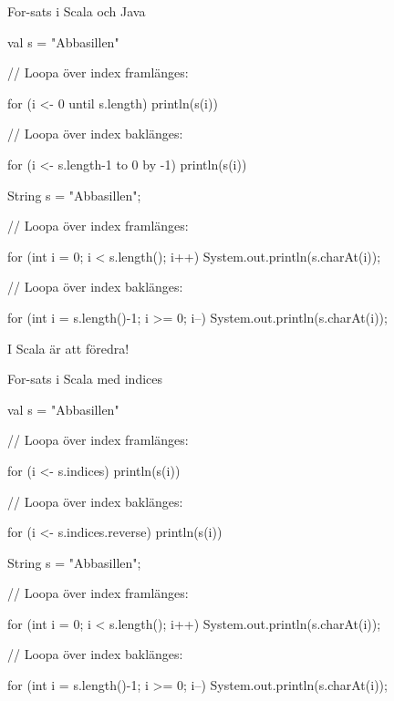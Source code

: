 \begin{Slide}{For-sats i Scala och Java}
\begin{multicols}{2}
\noindent{}
\begin{CodeSmall}[basicstyle=\ttfamily\SlideFontSize{6}{8},backgroundcolor=\color{white},
  frame=none]
val s = "Abbasillen"

// Loopa över index framlänges:

for (i <- 0 until s.length) {
  println(s(i))
}

// Loopa över index baklänges:

for (i <- s.length-1 to 0 by -1) {
  println(s(i))
}
\end{CodeSmall}

\columnbreak

\noindent{}
\begin{CodeSmall}[language=Java,basicstyle=\ttfamily\SlideFontSize{6}{8},backgroundcolor=\color{white},
  frame=none]
String s = "Abbasillen";

// Loopa över index framlänges:

for (int i = 0; i < s.length(); i++) {
    System.out.println(s.charAt(i));
}

// Loopa över index baklänges:

for (int i = s.length()-1; i >= 0; i--) {
    System.out.println(s.charAt(i));
}
\end{CodeSmall}
\end{multicols}
I Scala är  att föredra!
\end{Slide}


\begin{Slide}{For-sats i Scala med indices}
\begin{multicols}{2}
\noindent{}
\begin{CodeSmall}[basicstyle=\ttfamily\SlideFontSize{6}{8},backgroundcolor=\color{white},
  frame=none]
val s = "Abbasillen"

// Loopa över index framlänges:

for (i <- s.indices) {
  println(s(i))
}

// Loopa över index baklänges:

for (i <- s.indices.reverse) {
  println(s(i))
}
\end{CodeSmall}

\columnbreak

\noindent{}
\begin{CodeSmall}[language=Java,basicstyle=\footnotesize\ttfamily\SlideFontSize{6}{8},backgroundcolor=\color{white},
  frame=none]
String s = "Abbasillen";

// Loopa över index framlänges:

for (int i = 0; i < s.length(); i++) {
    System.out.println(s.charAt(i));
}

// Loopa över index baklänges:

for (int i = s.length()-1; i >= 0; i--) {
    System.out.println(s.charAt(i));
}
\end{CodeSmall}
\end{multicols}
\end{Slide}


